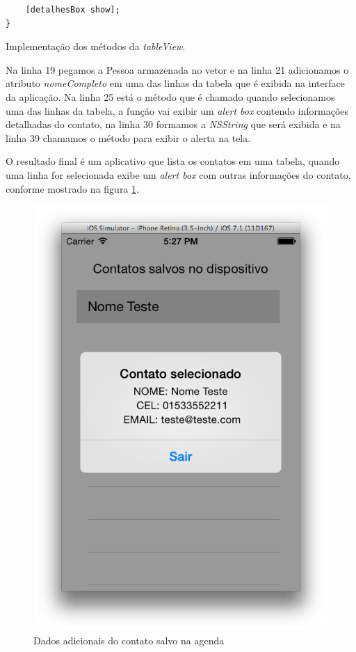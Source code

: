 \documentclass[a4paper,12pt,brazil,doubleside]{book}
\begin{document}
\begin{singlespace}
\begin{listing}[H]
\begin{verbatim}
    [detalhesBox show];   
}
\end{verbatim}
\caption{Implementação dos métodos da \emph{tableView}.}
\end{listing}

Na linha 19 pegamos a Pessoa armazenada no vetor e na linha 21 adicionamos o atributo \emph{nomeCompleto} em uma das linhas da tabela que é exibida na interface da aplicação. Na linha 25 está o método que é chamado quando selecionamos uma das linhas da tabela, a função vai exibir um \emph{alert box} contendo informações detalhadas do contato, na linha 30 formamos a \emph{NSString} que será exibida e na linha 39 chamamos o método para exibir o alerta na tela.

O resultado final é um aplicativo que lista os contatos em uma tabela, quando uma linha for selecionada exibe um \emph{alert box} com outras informações do contato, conforme mostrado na figura \ref{fig:detalhesContato}.

\begin{figure}[H]
  \centering
  \includegraphics[totalheight=0.55\textheight]{figuras/4/api_contatos3.png}
  \caption{Dados adicionais do contato salvo na agenda}
  \label{fig:detalhesContato}
\end{figure}


\end{singlespace}
\end{document}
